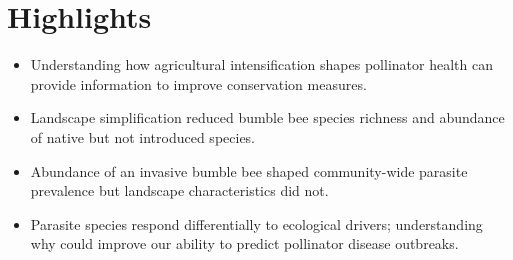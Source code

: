 \documentclass[12pt]{article}
\begin{document}
\section{Highlights}

\begin{itemize}
\item Understanding how agricultural intensification shapes pollinator health can provide information to improve conservation measures.
\item Landscape simplification reduced bumble bee species richness and abundance of native but not introduced species.
\item Abundance of an invasive bumble bee shaped community-wide parasite prevalence but landscape characteristics did not.
\item Parasite species respond differentially to ecological drivers; understanding why could improve our ability to predict pollinator disease outbreaks.
\end{itemize}
\end{document}
